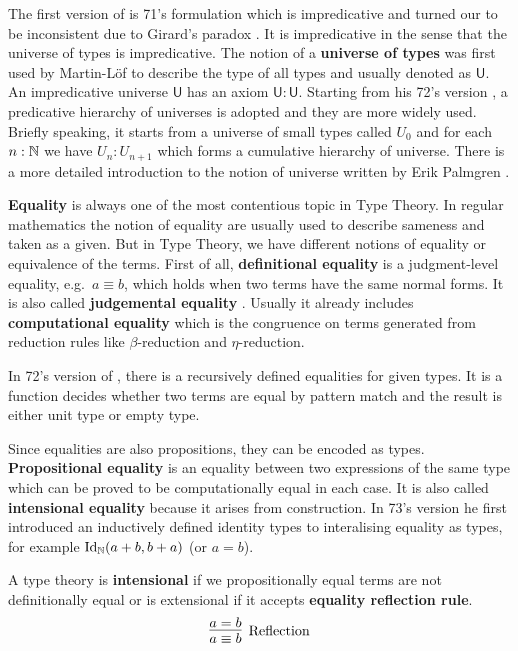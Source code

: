 The first version of \mltt is 71's formulation \cite{per:71} which is impredicative and turned our to be inconsistent due to Girard's paradox \cite{hurkens1995simplification}. It is impredicative in the sense that the universe of types is impredicative. The notion of a \textbf{universe of types} was first used by Martin-L\"{o}f \cite{Martin-Lof-1973} to describe the type of all types and usually denoted as $\mathsf{U}$. An impredicative universe $\mathsf{U}$ has an axiom $\mathsf{U} : \mathsf{U}$.
Starting from his 72's version \cite{Martin-Lof-1972}, a predicative hierarchy of universes is adopted and they are more widely used. Briefly speaking, it starts from a universe of small types called $U_0$ and for each $n : \mathbb{N}$ we have $U_n : U_{n+1}$ which forms a cumulative hierarchy of universe. There is a more detailed introduction to the notion of universe written by Erik Palmgren \cite{Palmgren98onuniverses}.


\textbf{Equality} is always one of the most contentious topic in Type Theory.
In regular mathematics the notion of equality are usually used to describe sameness and taken as a given.
But in Type Theory, we have different notions of equality or equivalence of the terms.
First of all, \textbf{definitional equality} is a judgment-level equality, e.g.\  $a \equiv b$, which holds when two terms have the same normal forms\cite{nor:90}. It is also called \textbf{judgemental equality} \cite{martin1984intuitionistic}. Usually it already includes \textbf{computational equality} which is the congruence on terms generated from reduction rules like $\beta$-reduction and $\eta$-reduction. 

In 72's version of \mltt, there is a recursively defined equalities for given types. It is a function decides whether two terms are equal by pattern match and the result is either unit type or empty type.

Since equalities are also propositions, they can be encoded as types. \textbf{Propositional equality} is an equality between two expressions of the same type which can be proved to be computationally equal in each case. It is also called \textbf{intensional equality} \cite{nor:90} because it arises from construction. In 73's version \cite{Martin-Lof-1973} he first introduced an inductively defined identity types to interalising equality as types, for example $\text{Id}_{\mathbb{N}}(a+b, b+a)$ (or $a = b$).


A type theory is \textbf{intensional} if we propositionally equal terms are not definitionally equal or is extensional if it accepts \textbf{equality reflection rule}.
\begin{equation}
\label{reflection}
\infer[\text{Reflection}]{a \equiv b}{a = b}
\end{equation}

